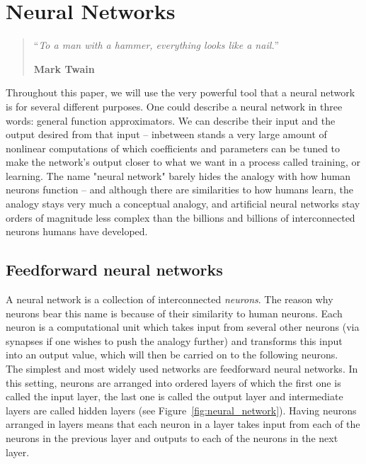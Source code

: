 \chapter{Neural Networks}
\begin{quotation}
\noindent ``\emph{To a man with a hammer, everything looks like a nail.}''
\begin{flushright}\textbf{Mark Twain}\end{flushright}
\end{quotation}
\vspace*{0.5cm}

Throughout this paper, we will use the very powerful tool that a neural network
is for several different purposes. One could describe a neural network in 
three words: general function approximators. We can describe their input
and the output desired from that input -- inbetween stands a very large amount of
nonlinear computations of which coefficients and parameters can be tuned to
make the network's output closer to what we want in a process called training, 
or learning. The name "neural network"
barely hides the analogy with how human neurons function -- and although there
are similarities to how humans learn, the analogy stays very much a conceptual
analogy, and artificial neural networks stay orders of magnitude less complex
than the billions and billions of interconnected neurons humans have developed. 

\section{Feedforward neural networks}
A neural network is a collection of interconnected \textit{neurons}. The
reason why neurons bear this name is because of their similarity to 
human neurons. Each neuron is a computational unit which takes input
from several other neurons (via synapses if one wishes to push the analogy further)
and transforms this input into an output value, which will then be carried on
to the following neurons.\\

The simplest and most widely used networks are feedforward neural networks. In
this setting, neurons are arranged into ordered layers of which the first one is
called the input layer, the last one is called the output layer and
intermediate layers are called hidden layers
(see Figure~\ref{fig:neural_network}). Having neurons arranged in layers
means that each neuron in a layer takes input from each of the neurons
in the previous layer and outputs to each of the neurons in the next layer.\\

